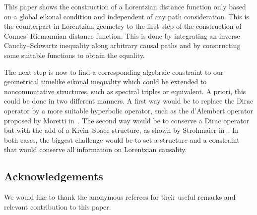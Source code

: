 \documentclass[pdftex]{sigma}
\begin{document}
This paper shows the construction of a Lorentzian distance function only based on a global eikonal condition and independent of any path consideration. This is the counterpart in Lo\-rent\-zian geometry to the f\/irst step of the construction of Connes' Riemannian distance function. This is done by integrating an inverse Cauchy--Schwartz inequality along arbitrary causal paths and by constructing some suitable functions to obtain the equality.

The next step is now to f\/ind a corresponding algebraic constraint to our geometrical timelike eikonal inequality which could be extended to noncommutative structures, such as spectral triples or equivalent. A priori, this could be done in two dif\/ferent manners. A f\/irst way would be to replace the Dirac operator by a more suitable hyperbolic operator, such as the d'Alembert operator proposed by Moretti in~\cite{Mor}. The second way would be to conserve a Dirac operator but with the add of a Krein--Space structure, as shown by Strohmaier in~\cite{Stro}. In both cases, the biggest challenge would be to set a structure and a constraint that would conserve all information on Lorentzian causality.


\subsection*{Acknowledgements}

We would like to thank the anonymous referees for their useful remarks and relevant contribution to this paper.
\end{document}
